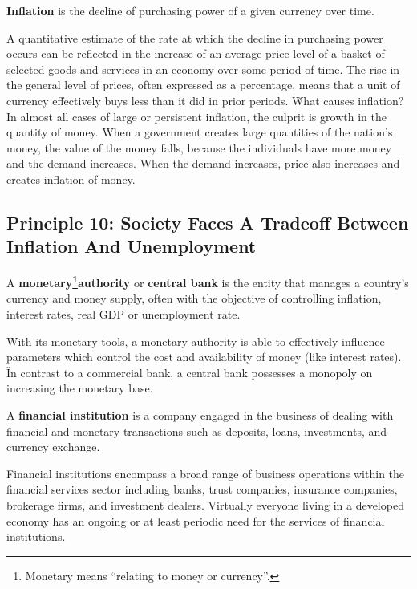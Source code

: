 \bd[Inflation]
\textbf{Inflation} is the decline of purchasing power of a given currency over time.
\ed

A quantitative estimate of the rate at which the decline in purchasing power occurs can be reflected in the increase
of an average price level of a basket of selected goods and services in an economy over some period of time. The rise
in the general level of prices, often expressed as a percentage, means that a unit of currency effectively buys less
than it did in prior periods. \v

What causes inflation? In almost all cases of large or persistent inflation, the culprit is growth in the quantity of
money. When a government creates large quantities of the nation's money, the value of the money falls, because the
individuals have more money and the demand increases. When the demand increases, price also increases and creates
inflation of money.

\subsection*{Principle 10: Society Faces A Tradeoff Between Inflation And Unemployment}

A \textbf{monetary\footnote{Monetary means ``relating to money or currency''.}authority} or \textbf{central bank} is
the entity that manages a country's currency and money supply, often with the objective of controlling inflation,
interest rates, real GDP or unemployment rate.
\ed

With its monetary tools, a monetary authority is able to effectively influence parameters which control the cost and
availability of money (like interest rates). \v

In contrast to a commercial bank, a central bank possesses a monopoly on increasing the monetary base.

A \textbf{financial institution} is a company engaged in the business of dealing with financial and monetary
transactions such as deposits, loans, investments, and currency exchange.
\ed

Financial institutions encompass a broad range of business operations within the financial services sector including
banks, trust companies, insurance companies, brokerage firms, and investment dealers. Virtually everyone living in a
developed economy has an ongoing or at least periodic need for the services of financial institutions.

